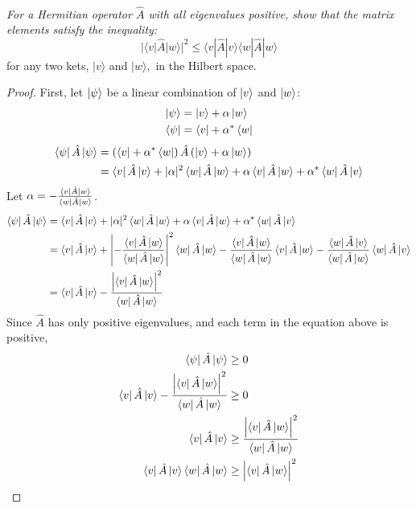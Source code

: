\documentclass[12pt, letterpaper]{article}
\begin{document}
\subsection{}
\textit{For a Hermitian operator $\hat{A}$ with all eigenvalues positive, show that the matrix elements satisfy the inequality:}
$$
|\langle v|\hat{A}| w\rangle|^{2} \leq\langle v|\hat{A}| v\rangle\langle w|\hat{A}| w\rangle
$$ for any two kets, $|v\rangle$ and $|w\rangle,$ in the Hilbert space.
\begin{proof}
First, let $\ket{\psi}$ be a linear combination of $\ket{v}$ and $\ket{w}$:
\begin{align*}
    \ket{\psi} &= \ket{v} +\alpha \ket{w} \\
    \bra{\psi}&= \bra{v} +\alpha^* \bra{w}
\end{align*}
\begin{align*}
    \bra\psi \hat{A} \ket\psi&= \left(\bra{v} +\alpha^* \bra{w}\right) \hat{A} \left(\ket{v} +\alpha \ket{w}\right)\\
    & =\bra{v}\hat{A} \ket{v}+|\alpha|^{2} \bra{w} \hat{A}  \ket{w} + \alpha \bra{v}\hat{A} \ket{w}+\alpha^{*}\bra{w}\hat{A} \ket{v}
\end{align*}
Let $\alpha = -\frac{\bra{v}\hat{A} \ket{w}}{\bra{w} \hat{A} \ket{w}}$.
\begin{align*}
    \bra\psi \hat{A} \ket\psi& =\bra{v}\hat{A} \ket{v}+|\alpha|^{2} \bra{w} \hat{A}  \ket{w} + \alpha \bra{v}\hat{A} \ket{w}+\alpha^{*}\bra{w}\hat{A} \ket{v}\\
    & =\bra{v}\hat{A} \ket{v}+\left| -\frac{\bra{v}\hat{A} \ket{w}}{\bra{w} \hat{A} \ket{w}}\right|^{2} \bra{w} \hat{A}  \ket{w}  -\frac{\bra{v}\hat{A} \ket{w}}{\bra{w} \hat{A} \ket{w}} \bra{v}\hat{A} \ket{w} -\frac{\bra{w}\hat{A} \ket{v}}{\bra{w} \hat{A} \ket{w}}\bra{w}\hat{A} \ket{v} \\
    &= \bra{v}\hat{A} \ket{v} - \frac{\left|\bra{v} \hat{A} \ket{w} \right|^2}{\bra{w} \hat{A} \ket{w}}
\end{align*}
Since $\hat{A}$ has only positive eigenvalues, and each term in the equation above is positive, 
\begin{align*}
     \bra\psi \hat{A} \ket\psi &\geq 0\\
     \bra{v}\hat{A} \ket{v} - \frac{\left|\bra{v} \hat{A} \ket{w} \right|^2}{\bra{w} \hat{A} \ket{w}} &\geq 0\\
     \bra{v}\hat{A} \ket{v} &\geq \frac{\left|\bra{v} \hat{A} \ket{w} \right|^2}{\bra{w} \hat{A} \ket{w}}\\
     \bra{v}\hat{A} \ket{v} \bra{w} \hat{A} \ket{w} &\geq \left|\bra{v} \hat{A} \ket{w} \right|^2
\end{align*}
\end{proof}
    
\end{document}
